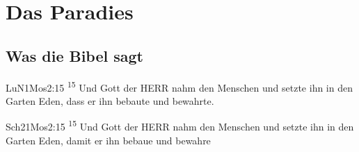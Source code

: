 \section{Das Paradies}
\subsection {Was die Bibel sagt}
\begin{bibeltext}{LuN}{1Mos}{2:15}
	\textsuperscript{15} Und Gott der HERR nahm den Menschen und setzte ihn in den Garten Eden, dass er ihn bebaute und bewahrte.
\end{bibeltext}

\begin{bibeltext}{Sch2}{1Mos}{2:15}
	\textsuperscript{15} Und Gott der HERR nahm den Menschen und setzte ihn in den Garten Eden, damit er ihn bebaue und bewahre
\end{bibeltext}

